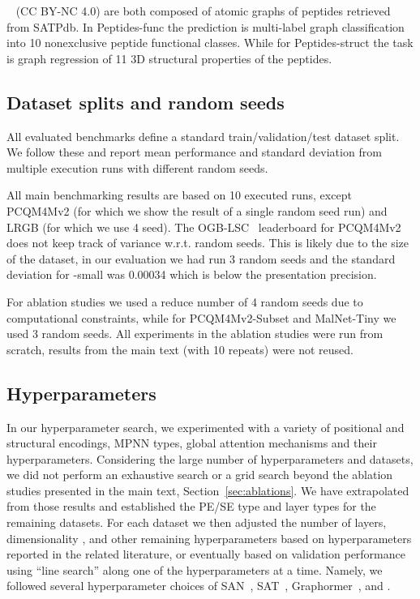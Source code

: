 \documentclass{article}
\begin{document}
~\cite{dwivedi2022LRGB} (CC BY-NC 4.0)
are both composed of atomic graphs of peptides retrieved from SATPdb. In Peptides-func the prediction is multi-label graph classification into 10 nonexclusive peptide functional classes. While for Peptides-struct the task is graph regression of 11 3D structural properties of the peptides.


\subsection{Dataset splits and random seeds}\label{app:splits}
All evaluated benchmarks define a standard train/validation/test dataset split. We follow these and report mean performance and standard deviation from multiple execution runs with different random seeds.

All main benchmarking results are based on 10 executed runs, except PCQM4Mv2 (for which we show the result of a single random seed run) and LRGB (for which we use 4 seed).
The OGB-LSC~\cite{hu2021ogblsc} leaderboard for PCQM4Mv2 does not keep track of variance w.r.t. random seeds. This is likely due to the size of the dataset, in our evaluation we had run 3 random seeds and the standard deviation for \method-small was 0.00034 which is below the presentation precision.

For ablation studies we used a reduce number of 4 random seeds due to computational constraints, while for PCQM4Mv2-Subset and MalNet-Tiny we used 3 random seeds. All experiments in the ablation studies were run from scratch, results from the main text (with 10 repeats) were not reused.


\subsection{Hyperparameters}\label{app:hyperparams}
In our hyperparameter search, we experimented with a variety of positional and structural encodings, MPNN types, global attention mechanisms and their hyperparameters. Considering the large number of hyperparameters and datasets, we did not perform an exhaustive search or a grid search beyond the ablation studies presented in the main text, Section~\ref{sec:ablations}. We have extrapolated from those results and established the PE/SE type and layer types for the remaining datasets. For each dataset we then adjusted the number of layers, dimensionality , and other remaining hyperparameters based on hyperparameters reported in the related literature, or eventually based on validation performance using ``line search'' along one of the hyperparameters at a time. Namely, we followed several hyperparameter choices of SAN~\cite{kreuzer2021rethinking}, SAT~\cite{chen2022SAT}, Graphormer~\cite{ying2021graphormer}, and \citet{freitas2021malnet}.
\end{document}
